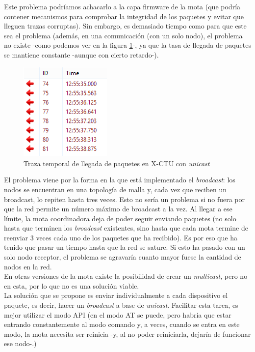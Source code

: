 Este problema podríamos achacarlo a la capa firmware de la mota (que podría contener mecanismos
para comprobar la integridad de los paquetes y evitar que lleguen trazas corruptas).
Sin embargo, es demasiado tiempo como para que este sea el problema (además, en una comunicación 
(con un solo nodo), el problema no existe -como podemos ver en la figura \ref{fig:xctu_comunicacionunoauno}-, ya
que la tasa de llegada de paquetes se mantiene constante -aunque con cierto retardo-).

\begin{figure}[!htb]
\centering
\includegraphics[width=0.4\textwidth]{./imagenes/xctu_comunicacionunoauno}
\caption{Traza temporal de llegada de paquetes en X-CTU con \textit{unicast}} \label{fig:xctu_comunicacionunoauno}
\end{figure}

El problema viene por la forma en la que está implementado el \textit{broadcast}:
los nodos se encuentran en una topología de malla y, cada vez que reciben un broadcast,
lo repiten hasta tres veces. Esto no sería un problema si no fuera por que la red
permite un número máximo de broadcast a la vez. Al llegar a ese límite, la mota
coordinadora deja de poder seguir enviando paquetes (no solo hasta que terminen los
\textit{broadcast} existentes, sino hasta que cada mota termine de reenviar 3 veces
cada uno de los paquetes que ha recibido). Es por eso que ha tenido que pasar un tiempo
hasta que la red se sature. Si esto ha pasado con un solo nodo receptor, el problema
se agravaría cuanto mayor fuese la cantidad de nodos en la red. \\

En otras versiones de la mota existe la posibilidad de crear un \textit{multicast},
pero no en esta, por lo que no es una solución viable.\\

La solución que se propone es enviar individualmente a cada dispositivo el paquete, es decir,
hacer un \textit{broadcast} a base de \textit{unicast}. Facilitar esta tarea, es mejor
utilizar el modo API (en el modo AT se puede, pero habría que estar entrando constantemente
al modo comando y, a veces, cuando se entra en este modo, la mota necesita ser reinicia -y,
al no poder reiniciarla, dejaría de funcionar ese nodo-.)\\

